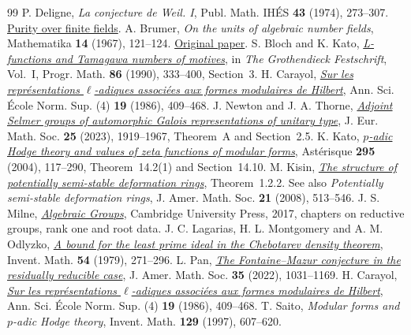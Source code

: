 \documentclass[a4paper,11pt]{article}
\theoremstyle{definition}
\theoremstyle{remark}
\numberwithin{equation}{section}
\begin{document}
\begin{thebibliography}{99}
 P. Deligne, \emph{La conjecture de Weil. I}, Publ. Math. IH\'ES \textbf{43} (1974), 273--307. \href{https://www.numdam.org/item/PMIHES_1974__43__273_0/}{Purity over finite fields}.
 A. Brumer, \emph{On the units of algebraic number fields}, Mathematika \textbf{14} (1967), 121--124. \href{https://doi.org/10.1112/S0025579300003703}{Original paper}.
 S. Bloch and K. Kato, \href{https://virtualmath1.stanford.edu/~conrad/BSDseminar/refs/BKTamagawa.pdf}{\emph{L-functions and Tamagawa numbers of motives}}, in \emph{The Grothendieck Festschrift}, Vol.~I, Progr. Math. \textbf{86} (1990), 333--400, Section~3.
 H. Carayol, \href{https://www.numdam.org/articles/10.24033/asens.1512/}{\emph{Sur les repr\'esentations \(\ell\)-adiques associ\'ees aux formes modulaires de Hilbert}}, Ann. Sci. \'Ecole Norm. Sup. (4) \textbf{19} (1986), 409--468.
 J. Newton and J. A. Thorne, \href{https://arxiv.org/pdf/1912.11265}{\emph{Adjoint Selmer groups of automorphic Galois representations of unitary type}}, J. Eur. Math. Soc. \textbf{25} (2023), 1919--1967, Theorem~A and Section~2.5.
 K. Kato, \href{https://archive.numdam.org/item/AST_2004__295__117_0.pdf}{\emph{\(p\)-adic Hodge theory and values of zeta functions of modular forms}}, Ast\'erisque \textbf{295} (2004), 117--290, Theorem~14.2(1) and Section~14.10.
 M. Kisin, \href{https://people.math.harvard.edu/~kisin/dvifiles/licm.pdf}{\emph{The structure of potentially semi-stable deformation rings}}, Theorem~1.2.2. See also \emph{Potentially semi-stable deformation rings}, J. Amer. Math. Soc. \textbf{21} (2008), 513--546.
 J. S. Milne, \href{https://www.jmilne.org/math/Books/iAG2022.pdf}{\emph{Algebraic Groups}}, Cambridge University Press, 2017, chapters on reductive groups, rank one and root data.
 J. C. Lagarias, H. L. Montgomery and A. M. Odlyzko, \href{https://doi.org/10.1007/BF01390234}{\emph{A bound for the least prime ideal in the Chebotarev density theorem}}, Invent. Math. \textbf{54} (1979), 271--296.
 L. Pan, \href{https://arxiv.org/pdf/1901.07166}{\emph{The Fontaine--Mazur conjecture in the residually reducible case}}, J. Amer. Math. Soc. \textbf{35} (2022), 1031--1169.
 H. Carayol, \href{https://www.numdam.org/articles/10.24033/asens.1512/}{\emph{Sur les repr\'esentations \(\ell\)-adiques associ\'ees aux formes modulaires de Hilbert}}, Ann. Sci. \'Ecole Norm. Sup. (4) \textbf{19} (1986), 409--468. T. Saito, \emph{Modular forms and \(p\)-adic Hodge theory}, Invent. Math. \textbf{129} (1997), 607--620.

\end{thebibliography}
\end{document}
